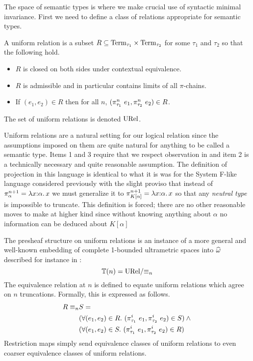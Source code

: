 The space of semantic types is where we make crucial use of syntactic
minimal invariance. First we need to define a class of relations
appropriate for semantic types.
\begin{defn}\label{def:guarded:urel}
  A uniform relation is a subset
  $R \subseteq \mathrm{Term}_{\tau_1} \times \mathrm{Term}_{\tau_2}$ for some $\tau_1$
  and $\tau_2$ so that the following hold.
  \begin{itemize}
  \item $R$ is closed on both sides under contextual equivalence.
  \item $R$ is admissible and in particular contains limits of all
    $\pi$-chains.
  \item If $(e_1, e_2) \in R$ then for all $n$,
    $(\pi_{\tau_1}^n\ e_1, \pi_{\tau_2}^n\ e_2) \in R$.
  \end{itemize}
  The set of uniform relations is denoted $\mathrm{URel}$.
\end{defn}
Uniform relations are a natural setting for our logical relation since
the assumptions imposed on them are quite natural for anything to be
called a semantic type. Items 1 and 3 require that we respect
observation in and item 2 is a technically necessary and quite
reasonable assumption. The definition of projection in this language
is identical to what it is was for the System F-like language considered
previously with the slight proviso that instead of
$\pi_{\alpha}^{n + 1} = \lambda x {:} \alpha.\, x$ we must generalize it to
$\pi_{K[\alpha]}^{n + 1} = \lambda x {:} \alpha.\, x$ so that any
\emph{neutral type} is impossible to truncate. This definition is
forced; there are no other reasonable moves to make at higher kind
since without knowing anything about $\alpha$ no information can be
deduced about $K[\alpha]$

The presheaf structure on uniform relations is an instance of a more
general and well-known embedding of complete 1-bounded ultrametric
spaces into $\widehat{\omega}$ described for instance in \citet{Birkedal:steps:11}:
\[
  \mathbb{T}(n) = \mathrm{URel} / {\equiv_n}
\]
The equivalence relation at $n$ is defined to equate uniform relations
which agree on $n$ truncations. Formally, this is expressed as
follows.
\begin{align*}
  R \equiv_n &S =\\
  &(\forall (e_1, e_2) \in R.\ (\pi^i_{\tau_1}\ e_1, \pi^i_{\tau_2}\ e_2) \in S) \land {}\\
  &(\forall (e_1, e_2) \in S.\ (\pi^i_{\tau_1}\ e_1, \pi^i_{\tau_2}\ e_2) \in R)
\end{align*}
Restriction maps simply send equivalence classes of uniform relations
to even coarser equivalence classes of uniform relations.


